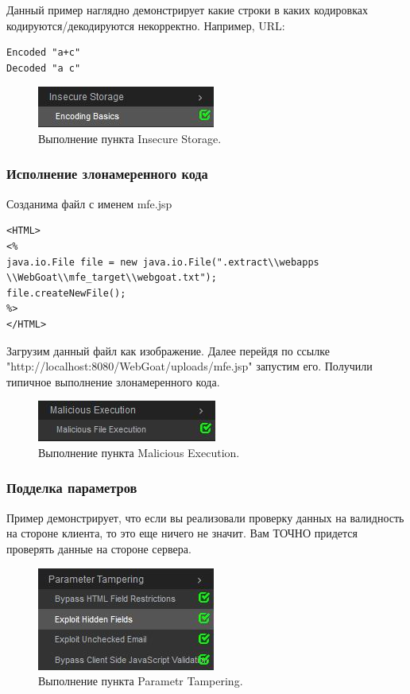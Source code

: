 \documentclass[10pt,a4paper]{article}
\begin{document}
Данный пример наглядно демонстрирует какие строки в каких кодировках кодируются/декодируются некорректно. Например, URL:
\begin{verbatim}
Encoded "a+c"
Decoded "a c"
\end{verbatim}


\begin{figure}[h!]
\centering
\includegraphics[scale=0.7]{13.jpg}
\caption{Выполнение пункта Insecure Storage.}
\end{figure}

\subsubsection{Исполнение злонамеренного кода}

Созданима файл с именем mfe.jsp
\begin{verbatim}
<HTML>
<%
java.io.File file = new java.io.File(".extract\\webapps
\\WebGoat\\mfe_target\\webgoat.txt");
file.createNewFile();
%>
</HTML>
\end{verbatim}

Загрузим данный файл как изображение. Далее перейдя по ссылке "http://localhost:8080/WebGoat/uploads/mfe.jsp" запустим его. Получили типичное выполнение злонамеренного кода.

\begin{figure}[h!]
\centering
\includegraphics[scale=0.7]{14.jpg}
\caption{Выполнение пункта Malicious Execution.}
\end{figure}


\subsubsection{Подделка параметров}

Пример демонстрирует, что если вы реализовали проверку данных на валидность на стороне клиента, то это еще ничего не значит. Вам ТОЧНО придется проверять данные на стороне сервера.

\begin{figure}[h!]
\centering
\includegraphics[scale=0.7]{15.jpg}
\caption{Выполнение пункта Parametr Tampering.}
\end{figure}
\end{document}
